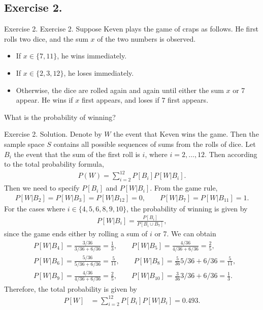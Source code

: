 \documentclass[hyperref={pdfpagelabels=false}]{beamer}
\newcommand{\structb}[1]{\textcolor[rgb]{0.2,0.2,0.7}{#1}}
\begin{document}
\subsection{Exercise 2.}
\begin{frame}{Exercise 2.}
    \justifying
    \structb{Exercise 2.} Suppose Keven plays the game of craps as follows. He first rolls two dice, and the sum $x$ of the two numbers is observed.
    \begin{itemize}
    	\item If $x \in \{7, 11\}$, he wins immediately.
    	\item If $x\in \{2, 3, 12\}$, he loses immediately.
    	\item Otherwise, the dice are rolled again and again until either the sum $x$ or 7 appear. He wins if $x$ first appears, and loses if $7$ first appears.
    \end{itemize}
    What is the probability of winning?
\end{frame}
%
\begin{frame}[allowframebreaks]{Exercise 2.}
    \justifying
    \structb{Solution.} Denote by $W$ the event that Keven wins the game. Then the sample space $S$ contains all possible sequences of sums from the rolls of dice. Let $B_i$ the event that the sum of the first roll is $i$, where $i = 2, \ldots, 12$. Then according to the total probability formula, 
    \begin{align*}
        P(W) = \sum_{i=2}^{12} P[B_i]P[W|B_i].
    \end{align*}
    Then we need to specify $P[B_i]$ and $P[W|B_i]$. From the game rule,
    \begin{align*}
        P[W|B_2] = P[W|B_3] = P[W|B_{12}] = 0, \qquad P[W|B_7] = P[W|B_{11}] = 1.
    \end{align*}
    For the cases where $i\in \{4, 5, 6, 8, 9, 10\}$, the probability of winning is given by
    \begin{align*}
        P[W|B_i] = \frac{P[B_i]}{P[B_i\cup B_7]},
    \end{align*}
    since the game ends either by rolling a sum of $i$ or 7. We can obtain
    \begin{align*}
        & P[W|B_4] = \frac{3/36}{3/36 + 6/36} = \frac{1}{3}, \qquad P[W|B_5] = \frac{4/36}{4/36 + 6/36} = \frac{2}{5}, \\
        & P[W|B_6] = \frac{5/36}{5/36 + 6/36} = \frac{5}{11}, \qquad P[W|B_8] = \frac{5}{36}{5/36 + 6/36} = \frac{5}{11}, \\
        & P[W|B_9] = \frac{4/36}{4/36 + 6/36} = \frac{2}{5}, \qquad P[W|B_{10}] = \frac{3}{36}{3/36 + 6/36} = \frac{1}{3}.
    \end{align*}
    Therefore, the total probability is given by
    \begin{align*}
        P[W] & = \sum_{i=2}^{12} P[B_i]P[W|B_i] = 0.493.
    \end{align*}
\end{frame}
%
\end{document}
